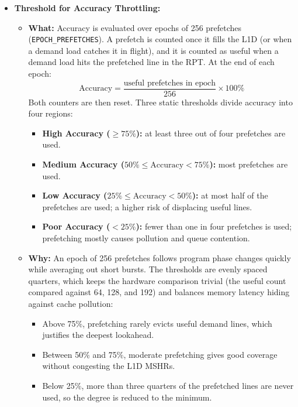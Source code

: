 \documentclass[a4paper, 11pt]{article}
\begin{document}
\begin{itemize}
    \item \textbf{Threshold for Accuracy Throttling:}
    \begin{itemize}
        \item \textbf{What:} Accuracy is evaluated over epochs of 256 prefetches (\texttt{EPOCH\_PREFETCHES}). A prefetch is counted once it fills the L1D (or when a demand load catches it in flight), and it is counted as useful when a demand load hits the prefetched line in the RPT. At the end of each epoch:
        \begin{equation}
            \text{Accuracy} = \frac{\text{useful prefetches in epoch}}{256} \times 100\%
        \end{equation}
        Both counters are then reset. Three static thresholds divide accuracy into four regions:
        \begin{itemize}
            \item \textbf{High Accuracy ($\ge 75\%$):} at least three out of four prefetches are used.
            \item \textbf{Medium Accuracy ($50\% \le \text{Accuracy} < 75\%$):} most prefetches are used.
            \item \textbf{Low Accuracy ($25\% \le \text{Accuracy} < 50\%$):} at most half of the prefetches are used; a higher risk of displacing useful lines.
            \item \textbf{Poor Accuracy ($< 25\%$):} fewer than one in four prefetches is used; prefetching mostly causes pollution and queue contention.
        \end{itemize}

        \item \textbf{Why:} An epoch of 256 prefetches follows program phase changes quickly while averaging out short bursts. The thresholds are evenly spaced quarters, which keeps the hardware comparison trivial (the useful count compared against 64, 128, and 192) and balances memory latency hiding against cache pollution:
        \begin{itemize}
            \item Above 75\%, prefetching rarely evicts useful demand lines, which justifies the deepest lookahead.
            \item Between 50\% and 75\%, moderate prefetching gives good coverage without congesting the L1D MSHRs.
            \item Below 25\%, more than three quarters of the prefetched lines are never used, so the degree is reduced to the minimum.
        \end{itemize}
    \end{itemize}


\end{itemize}
\end{document}
